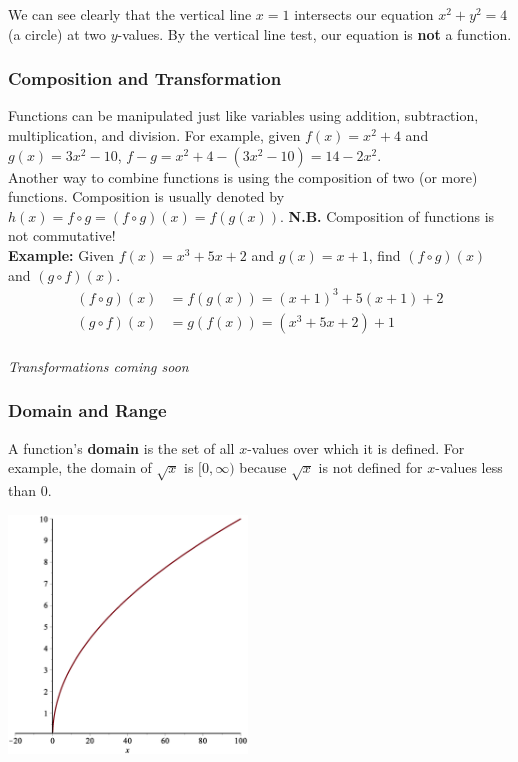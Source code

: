 \documentclass[oneside]{article}
\begin{document}
We can see clearly that the vertical line $x=1$ intersects our equation $x^2 + y^2 = 4$ (a circle) at two $y$-values. By the vertical line test, our equation is \textbf{not} a function.

\subsubsection{Composition and Transformation}
Functions can be manipulated just like variables using addition, subtraction, multiplication, and division. For example, given $f(x) = x^2 + 4$ and $g(x) = 3x^2 - 10$, $f - g = x^2 + 4 - (3x^2 - 10) = 14 - 2x^2$. \\

Another way to combine functions is using the composition of two (or more) functions. Composition is usually denoted by $h(x) = f \circ g = (f \circ g)(x) = f(g(x))$. \textbf{N.B.} Composition of functions is not commutative! \\

\textbf{Example:} Given $f(x) = x^3 + 5x + 2$ and $g(x) = x + 1$, find $(f \circ g)(x)$ and $(g \circ f)(x)$.
\begin{align*}
	(f \circ g)(x) & = f(g(x)) = (x+1)^3 + 5(x+1) + 2 \\
	(g \circ f)(x) & = g(f(x)) = (x^3 + 5x + 2) + 1 \\
\end{align*}

\textit{Transformations coming soon}

\subsubsection{Domain and Range}
A function's \textbf{domain} is the set of all $x$-values over which it is defined. For example, the domain of $\sqrt{x}$ is $[0,\infty)$ because $\sqrt{x}$ is not defined for $x$-values less than 0.

\begin{center}
\includegraphics[width=2.5in, height=2.5in]{img/sqrtx_domain.eps} \\
\end{center}
\end{document}
